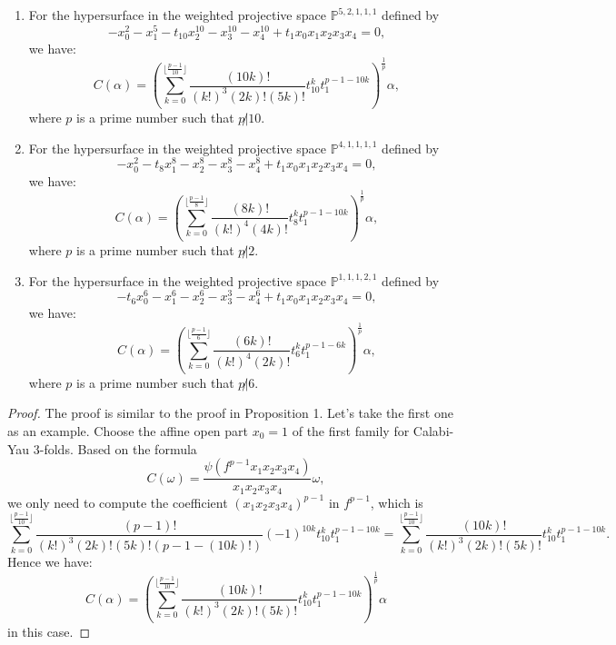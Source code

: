 \documentclass[10pt,a4paper]{amsart}
\begin{document}
\begin{prop} 
\begin{enumerate}
    \item 
For the hypersurface in the weighted projective space $\mathbb{P}^{5,2,1,1,1}$ defined by
\[
-x_0^2 - x_1^5 - t_{10}x_2^{10} - x_3^{10} - x_4^{10} +t_1 x_0x_1x_2x_3x_4 = 0,
\]
we have:
\begin{equation}
C(\alpha) = \left( \sum_{k=0}^{\lfloor \frac{p-1}{10} \rfloor} \frac{(10k)!}{(k!)^3(2k)!(5k)!}t_{10}^k t_1^{p-1-10k} \right)^{\frac{1}{p}} \alpha,
\end{equation}
where $p$ is a prime number such that $p\not|10$.
\item
For the hypersurface in the weighted projective space $\mathbb{P}^{4,1,1,1,1}$ defined by
\[
-x_0^2 -t_8 x_1^8 - x_2^{8} - x_3^{8} - x_4^{8} +t_1 x_0x_1x_2x_3x_4 = 0,
\]
we have:
\begin{equation}
C(\alpha) = \left( \sum_{k=0}^{\lfloor \frac{p-1}{8} \rfloor} \frac{(8k)!}{(k!)^4(4k)!}t_{8}^k t_1^{p-1-10k} \right)^{\frac{1}{p}} \alpha,
\end{equation}
where $p$ is a prime number such that $p\not| 2$.
\item 
For the hypersurface in the weighted projective space $\mathbb{P}^{1,1,1,2,1}  $ defined by
\[
-t_6x_0^6 - x_1^6 - x_2^{6} - x_3^{3} - x_4^{6} +t_1 x_0x_1x_2x_3x_4 = 0,
\]
we have:
\begin{equation}
C(\alpha) = \left( \sum_{k=0}^{\lfloor \frac{p-1}{6} \rfloor} \frac{(6k)!}{(k!)^4(2k)!}t_{6}^k t_1^{p-1-6k} \right)^{\frac{1}{p}} \alpha,
\end{equation}
where $p$ is a prime number such that $p\not|6$.
\end{enumerate}
\end{prop}

\begin{proof}
The proof is similar to the proof in Proposition 1. Let's take the first one as an example. Choose the affine open part $x_0 = 1$ of the first family for Calabi-Yau 3-folds. Based on the formula
\begin{equation}
C(\omega) = \frac{\psi(f^{p-1}x_1x_2x_3x_{4})}{x_1x_2x_3x_{4}} \omega,
\end{equation}
we only need to compute the coefficient $(x_1x_2x_3x_4)^{p-1}$ in $f^{p-1}$, which is
\[
\sum_{k=0}^{\lfloor \frac{p-1}{10} \rfloor}\frac{(p-1)!}{(k!)^{3}(2k)!(5k)!(p-1-(10k)!)} (-1)^{10k}t_{10}^k t_1^{p-1-10k}= \sum_{k=0}^{\lfloor \frac{p-1}{10} \rfloor}\frac{(10k)!}{(k!)^{3}(2k)!(5k)!} t_{10}^k t_1^{p-1-10k}.
\]
Hence we have:
\[
C(\alpha) = \left( \sum_{k=0}^{\lfloor \frac{p-1}{10} \rfloor} \frac{(10k)!}{(k!)^3(2k)!(5k)!}t_{10}^k t_1^{p-1-10k} \right)^{\frac{1}{p}} \alpha
\]
in this case.
\end{proof}
\end{document}
